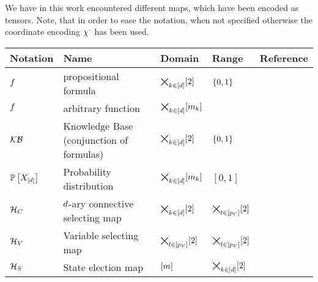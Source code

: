 
We have in this work encountered different maps, which have been encoded as tensors.
Note, that in order to ease the notation, when not specified otherwise the coordinate encoding $\chi^{\cdot}$ has been used.

\begin{center}
\begin{tabular}{l|l|l|l|l}
    \textbf{Notation} & \textbf{Name} & \textbf{Domain} & \textbf{Range} & \textbf{Reference} \\
    \hline
    $f$ & propositional formula & $\bigtimes_{k\in[d]}[2]$ & $\{0,1\}$ & {def:formulas} \\
    $f$ & arbitrary function & $\bigtimes_{k\in[d]}[m_{k}]$ & &   \\
    $\mathcal{KB}$ & Knowledge Base (conjunction of formulas) & $\bigtimes_{k\in[d]}[2]$ & $\{0,1\}$ & \\
    $\mathbb{P}\left[X_{[d]}\right]$ & Probability distribution & $\bigtimes_{k\in[d]}[m_{k}]$ & $[0,1]$ &  {def:probabilityDistribution} \\
    $\mathcal{H}_{C}$ & $d$-ary connective selecting map & $\bigtimes_{k\in[d]}[2]$ & $\bigtimes_{l\in[p_{C}]}[2]$ & {def:connectiveSelector} \\
    $\mathcal{H}_{V}$ & Variable selecting map & $\bigtimes_{l\in[p_{V}]}[2]$ & $\bigtimes_{l\in[p_{V}]}[2]$ & {def:variableSelector} \\ %
    $\mathcal{H}_{S}$ & State election map & $[m]$ & $\bigtimes_{k\in[d]}[2]$ & {def:stateselector} \\

\end{tabular}
\end{center}